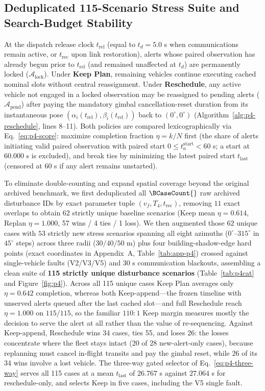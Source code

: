 \subsection{Deduplicated 115-Scenario Stress Suite and Search-Budget Stability}
At the dispatch release clock $t_{\mathrm{rel}}$ (equal to $t_d=5.0$ s when communications remain active, or $t_{\mathrm{rec}}$ upon link restoration), alerts whose paired observation has already begun prior to $t_{\mathrm{rel}}$ (and remained unaffected at $t_d$) are permanently locked ($\mathcal{A}_{\mathrm{lock}}$). Under \textbf{Keep Plan}, remaining vehicles continue executing cached nominal slots without central reassignment. Under \textbf{Reschedule}, any active vehicle not engaged in a locked observation may be reassigned to pending alerts ($\mathcal{A}_{\mathrm{pend}}$) after paying the mandatory gimbal cancellation-reset duration from its instantaneous pose $(\alpha_i(t_{\mathrm{rel}}),\beta_i(t_{\mathrm{rel}}))$ back to $(0^\circ,0^\circ)$ (Algorithm~\ref{alg:p4-reschedule}, lines 8--11). Both policies are compared lexicographically via Eq.~\eqref{eq:p4-score}: maximize completion fraction $\eta=k/N$ first (the share of alerts initiating valid paired observation with paired start $0\le t_a^{\mathrm{start}}<60$ s; a start at $60.000$ s is excluded), and break ties by minimizing the latest paired start $t_{\mathrm{last}}$ (censored at 60 s if any alert remains unstarted).

To eliminate double-counting and expand spatial coverage beyond the original archived benchmark, we first deduplicated all $\BCaseCount{}$ raw archived disturbance IDs by exact parameter tuple $(v_f, T_4, t_{\mathrm{rec}})$, removing $11$ exact overlaps to obtain $62$ strictly unique baseline scenarios (Keep mean $\eta=0.614$, Replan $\eta=1.000$, 57 wins / 4 ties / 1 loss). We then augmented those $62$ unique cases with $53$ strictly new stress scenarios spanning all eight azimuths ($0^\circ$--$315^\circ$ in $45^\circ$ steps) across three radii ($30/40/50$ m) plus four building-shadow-edge hard points (exact coordinates in Appendix~A, Table~\ref{tab:app-p4}) crossed against single-vehicle faults (V2/V3/V5) and 30 s communication blackouts, assembling a clean suite of \textbf{115 strictly unique disturbance scenarios} (Table~\ref{tab:p4cat} and Figure~\ref{fig:p4}). Across all 115 unique cases Keep Plan averages only $\eta=0.642$ completion, whereas both Keep-append---the frozen timeline with unserved alerts queued after the last cached slot---and full Reschedule reach $\eta=1.000$ on $115/115$, so the familiar $110{:}1$ Keep margin measures mostly the decision to serve the alert at all rather than the value of re-sequencing. Against Keep-append, Reschedule wins 34 cases, ties 55, and loses 26: the losses concentrate where the fleet stays intact (20 of 28 new-alert-only cases), because replanning must cancel in-flight transits and pay the gimbal reset, while 26 of its 34 wins involve a lost vehicle. The three-way gated selector of Eq.~\eqref{eq:p4-three-way} serves all 115 cases at a mean $t_{\mathrm{last}}$ of $26.767$ s against $27.064$ s for reschedule-only, and selects Keep in five cases, including the V5 single fault.

